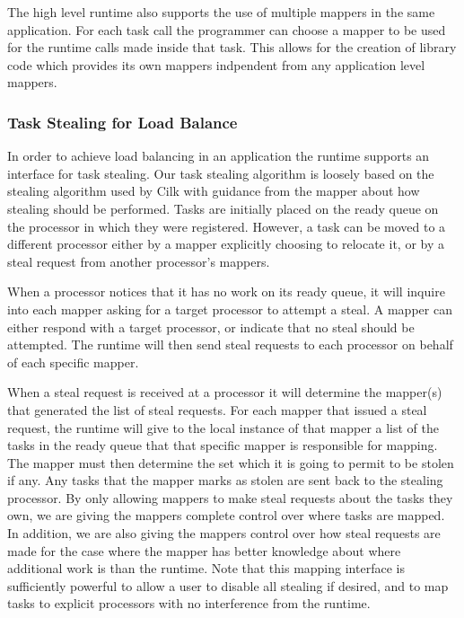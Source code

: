 The high level runtime also supports the use of multiple mappers in the same application.  For each task 
call the programmer can choose a mapper to be used for the runtime calls made inside that
task.  This allows for the creation of library code which provides its own mappers indpendent
from any application level mappers.

\subsubsection{Task Stealing for Load Balance}
\label{subsec:steal}
In order to achieve load balancing in an application the runtime supports an interface
for task stealing.  Our task stealing algorithm is loosely based on the stealing algorithm
used by Cilk \cite{CILK95} with guidance from the mapper about how stealing should be
performed.  Tasks are initially placed on the ready queue on the processor in which they
were registered.  However, a task can be moved to a different processor either by a mapper
explicitly choosing to relocate it, or by a steal request from another processor's mappers.

When a processor notices that it has no work on its ready queue, it will inquire into each
mapper asking for a target processor to attempt a steal.  A mapper can either respond with
a target processor, or indicate that no steal should be attempted.  The runtime will then
send steal requests to each processor on behalf of each specific mapper.  

When a steal request is received at a processor it will determine the mapper(s) that generated
the list of steal requests.  For each mapper that issued a steal request, the runtime will
give to the local instance of that mapper a list of the tasks in the ready queue that that
specific mapper is responsible for mapping.  The mapper must then determine the set which
it is going to permit to be stolen if any.  Any tasks that the mapper marks as stolen are
sent back to the stealing processor.  By only allowing mappers to make steal requests about
the tasks they own, we are giving the mappers complete control over where tasks are mapped.
In addition, we are also giving the mappers control over how steal requests are made for
the case where the mapper has better knowledge about where additional work is than the 
runtime.  Note that this mapping interface is sufficiently powerful to allow a user to
disable all stealing if desired, and to map tasks to explicit processors with no interference
from the runtime.

